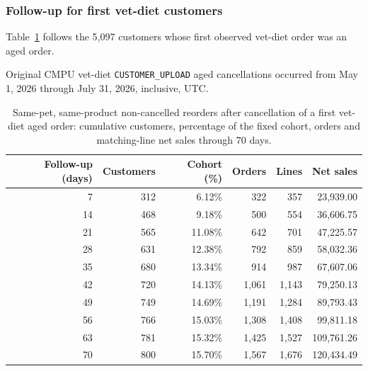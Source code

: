 \clearpage
\subsubsection{Follow-up for first vet-diet customers}
Table~\ref{tab:financial-opportunity-new-vet-diet-follow-up} follows the
5,097 customers whose first observed vet-diet order was an aged order.

Original CMPU vet-diet
\texttt{CUSTOMER\_UPLOAD} aged cancellations occurred from
May 1, 2026 through July 31, 2026, inclusive, UTC.

\begin{table}[!htbp]
\centering
\caption{Same-pet, same-product non-cancelled reorders after cancellation of a first vet-diet aged order: cumulative customers, percentage of the fixed cohort, orders and matching-line net sales through 70 days.}
\label{tab:financial-opportunity-new-vet-diet-follow-up}
\begin{tabular}{@{}rrrrrr@{}}
\toprule
Follow-up (days) & Customers & Cohort (\%) & Orders & Lines & Net sales \\
\midrule
7 & 312 & 6.12\% & 322 & 357 & 23,939.00 \\
14 & 468 & 9.18\% & 500 & 554 & 36,606.75 \\
21 & 565 & 11.08\% & 642 & 701 & 47,225.57 \\
28 & 631 & 12.38\% & 792 & 859 & 58,032.36 \\
35 & 680 & 13.34\% & 914 & 987 & 67,607.06 \\
42 & 720 & 14.13\% & 1,061 & 1,143 & 79,250.13 \\
49 & 749 & 14.69\% & 1,191 & 1,284 & 89,793.43 \\
56 & 766 & 15.03\% & 1,308 & 1,408 & 99,811.18 \\
63 & 781 & 15.32\% & 1,425 & 1,527 & 109,761.26 \\
70 & 800 & 15.70\% & 1,567 & 1,676 & 120,434.49 \\
\bottomrule
\end{tabular}


\end{table}
